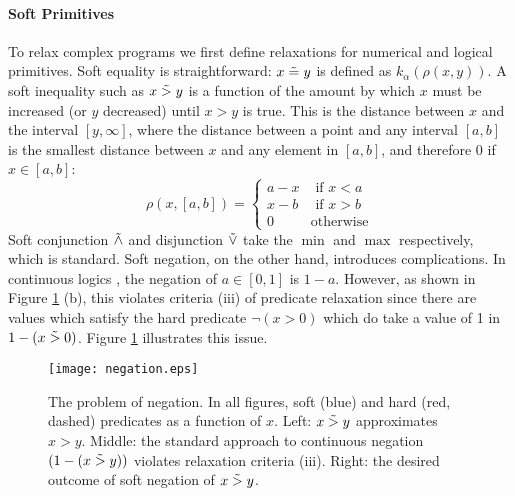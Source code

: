 


\paragraph{Soft Primitives}
To relax complex programs we first define relaxations for numerical and logical primitives.
Soft equality is straightforward: $x \mathrel{\tilde{=}} y$ is defined as $k_\alpha(\rho(x, y))$.
A soft inequality such as $x \mathrel{\tilde{>}} y$ is a function of the amount by which $x$ must be increased (or $y$ decreased) until $x > y$ is true.
This is the distance between $x$ and the interval $[y, \infty]$, where the distance between a point and any interval $[a, b]$ is the smallest distance between $x$ and any element in $[a, b]$, and therefore 0 if $x \in [a, b]$:
\begin{equation}
\rho(x, [a, b]) =
\begin{cases}
  a - x & \text{ if } x < a\\
  x - b & \text{ if } x > b\\
  0              & \text{otherwise}
\end{cases}
\end{equation}
Soft conjunction $\mathrel{\tilde{\land}}$ and disjunction $\mathrel{\tilde{\lor}}$ take the $\min$ and $\max$ respectively, which is standard.
Soft negation, on the other hand, introduces complications.
In continuous logics \cite{kimmig2012short}, the negation of $a \in [0, 1]$ is $1 - a$.
However, as shown in Figure \ref{negationimg} (b), this violates criteria (iii) of predicate relaxation since there are values which satisfy the hard predicate $\neg(x > 0)$ which do take a value of 1 in $1 - (x \mathrel{\tilde{>}} 0)$.
Figure \ref{negationimg} illustrates this issue.


\begin{figure}
\texttt{[image: negation.eps]}
\caption{The problem of negation.  In all figures, soft (blue) and hard (red, dashed) predicates as a function of $x$.  Left: $x \mathrel{\tilde{>}} y$ approximates $x > y$. Middle:  the standard approach to continuous negation $(1- (x \mathrel{\tilde{>}} y))$ violates relaxation criteria (iii). Right: the desired outcome of soft negation of $x \mathrel{\tilde{>}} y$.}\label{negationimg}
\end{figure}


